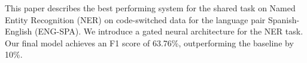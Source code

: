 This paper describes the best performing system for the shared task on Named Entity Recognition (NER) on code-switched data for the language pair Spanish-English (ENG-SPA). We introduce a gated neural architecture for the NER task. Our final model achieves an F1 score of 63.76\%, outperforming the baseline by 10\%.
